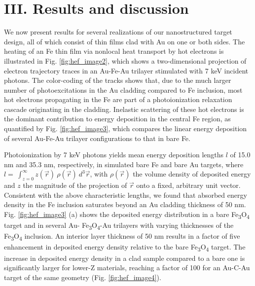 \section{III. Results and discussion}

We now present results for several realizations of our nanostructured
target design, all of which consist of thin films clad with Au on one or
both sides. The heating of an Fe thin film via nonlocal heat transport
by hot electrons is illustrated in Fig. \ref{fig:hef_image2}, which shows a two-dimensional
projection of electron trajectory traces in an Au-Fe-Au trilayer
stimulated with 7 keV incident photons. The color-coding of the tracks
shows that, due to the much larger number of photoexcitations in the Au
cladding compared to Fe inclusion, most hot electrons propagating in the
Fe are part of a photoionization relaxation cascade originating in the
cladding. Inelastic scattering of these hot electrons is the dominant
contribution to energy deposition in the central Fe region, as
quantified by Fig. \ref{fig:hef_image3}, which compares the linear energy deposition of
several Au-Fe-Au trilayer configurations to that in bare Fe.

Photoionization by 7 keV photons yields mean energy deposition lengths
\(l\) of 15.0 nm and 35.3 nm, respectively, in simulated bare Fe and
bare Au targets, where
\(l = \ \int_{z = 0}^{\infty}{z(\overrightarrow{r})\ \rho\left( \overrightarrow{r} \right)\ d^{3}\overrightarrow{r}}\),
with \(\rho\left( \overrightarrow{r} \right)\) the volume density of
deposited energy and \(z\) the magnitude of the projection of
\(\overrightarrow{r}\) onto a fixed, arbitrary unit vector. Consistent
with the above characteristic lengths, we found that absorbed energy
density in the Fe inclusion saturates beyond an Au cladding thickness of
50 nm. Fig. \ref{fig:hef_image3} (a) shows the deposited energy distribution in a bare
Fe\textsubscript{3}O\textsubscript{4} target and in several Au-
Fe\textsubscript{3}O\textsubscript{4}-Au trilayers with varying
thicknesses of the Fe\textsubscript{3}O\textsubscript{4} inclusion. An
interior layer thickness of 50 nm results in a factor of five
enhancement in deposited energy density relative to the bare
Fe\textsubscript{3}O\textsubscript{4} target. The increase in deposited
energy density in a clad sample compared to a bare one is significantly
larger for lower-Z materials, reaching a factor of 100 for an Au-C-Au
target of the same geometry (Fig. \ref{fig:hef_image4}).

